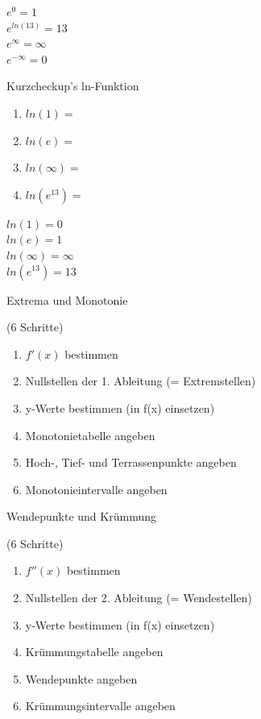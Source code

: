 \begin{antwort}\begin{center}
		$e^0=1$\\
		$e^{ln(13)}=13$\\
		$e^\infty=\infty$\\
		$e^{-\infty}=0$				
	\end{center}\end{antwort}
\begin{frage}Kurzcheckup's ln-Funktion
	\begin{enumerate}
		\item $ln(1)=$
		\item $ln(e)=$
		\item $ln(\infty)=$
		\item $ln(e^{13})=$				
	\end{enumerate}\end{frage}
\begin{antwort}\begin{center}
		$ln(1)=0$\\
		$ln(e)=1$\\
		$ln(\infty)=\infty$\\
		$ln(e^{13})=13$					
	\end{center}\end{antwort}
\begin{frage}Extrema und Monotonie \bigskip 
	
	(6 Schritte)\end{frage}
\begin{antwort}\begin{enumerate}
		\item $f'(x)$ bestimmen
		\item Nullstellen der 1. Ableitung (= Extremstellen)
		\item y-Werte bestimmen (in f(x) einsetzen)
		\item Monotonietabelle angeben
		\item Hoch-, Tief- und Terrassenpunkte angeben
		\item Monotonieintervalle angeben						
	\end{enumerate}\end{antwort}
\begin{frage}Wendepunkte und Krümmung \bigskip 
	
	(6 Schritte)\end{frage}
\begin{antwort}\begin{enumerate}
		\item $f''(x)$ bestimmen
		\item Nullstellen der 2. Ableitung (= Wendestellen)
		\item y-Werte bestimmen (in f(x) einsetzen)
		\item Krümmungstabelle angeben
		\item Wendepunkte angeben
		\item Krümmungsintervalle angeben						
	\end{enumerate}\end{antwort}
